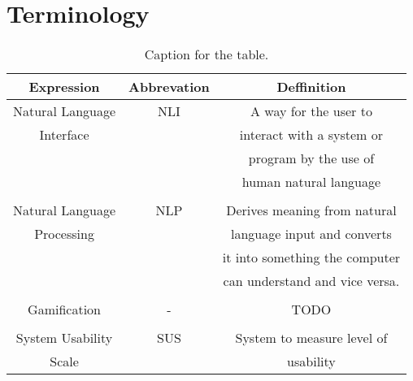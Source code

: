 
\section{Terminology}

\begin{table}[h!]
  \centering
  \begin{tabular}{ccc}
    \toprule
    Expression & Abbrevation & Deffinition\\
    \midrule
    Natural Language & NLI & A way for the user to\\
    Interface & & interact with a system or\\ 
    & & program by the use of\\
    & & human natural language\\
    \\
    Natural Language & NLP & Derives meaning from natural\\
    Processing & & language input and converts\\
    & & it into something the computer\\
    & & can understand and vice versa.\\
    \\
    Gamification & - & TODO \\
    \\
    System Usability & SUS & System to measure level of\\
    Scale & &  usability\\
    \bottomrule
  \end{tabular}
  \caption{Caption for the table.}\label{termin}
\end{table}